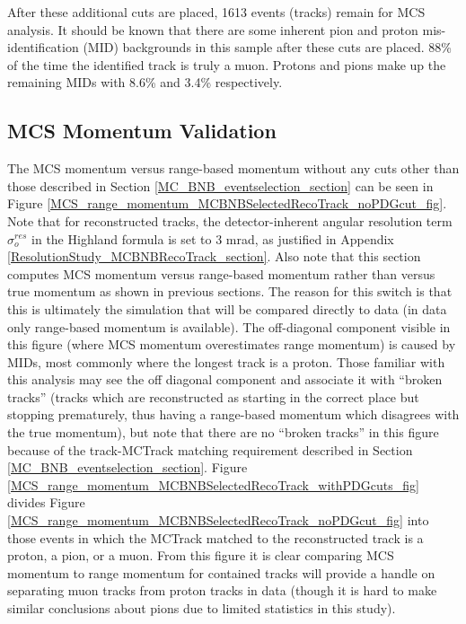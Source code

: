 After these additional cuts are placed, 1613 events (tracks) remain for MCS analysis. It should be known that there are some inherent pion and proton mis-identification (MID) backgrounds in this sample after these cuts are placed. 88\% of the time the identified track is truly a muon. Protons and pions make up the remaining MIDs with 8.6\% and 3.4\% respectively.




\subsection{MCS Momentum Validation}\label{MCS_Momentum_Validation_MCBNBSelectedRecoTrack_section}
The MCS momentum versus range-based momentum without any cuts other than those described in Section \ref{MC_BNB_eventselection_section} can be seen in Figure \ref{MCS_range_momentum_MCBNBSelectedRecoTrack_noPDGcut_fig}. Note that for reconstructed tracks, the detector-inherent angular resolution term $\sigma_o^{res}$ in the Highland formula is set to 3 mrad, as justified in Appendix \ref{ResolutionStudy_MCBNBRecoTrack_section}. Also note that this section computes MCS momentum versus range-based momentum rather than versus true momentum as shown in previous sections. The reason for this switch is that this is ultimately the simulation that will be compared directly to data (in data only range-based momentum is available). The off-diagonal component visible in this figure (where MCS momentum overestimates range momentum) is caused by MIDs, most commonly where the longest track is a proton. Those familiar with this analysis may see the off diagonal component and associate it with ``broken tracks'' (tracks which are reconstructed as starting in the correct place but stopping prematurely, thus having a range-based momentum which disagrees with the true momentum), but note that there are no ``broken tracks'' in this figure because of the track-{\sc MCTrack} matching requirement described in Section \ref{MC_BNB_eventselection_section}. Figure \ref{MCS_range_momentum_MCBNBSelectedRecoTrack_withPDGcuts_fig} divides Figure \ref{MCS_range_momentum_MCBNBSelectedRecoTrack_noPDGcut_fig} into those events in which the MCTrack matched to the reconstructed track is a proton, a pion, or a muon. From this figure it is clear comparing MCS momentum to range momentum for contained tracks will provide a handle on separating muon tracks from proton tracks in data (though it is hard to make similar conclusions about pions due to limited statistics in this study).\\

